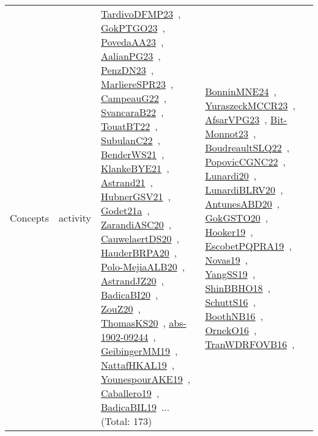 {\begin{longtable}{lp{3cm}>{\raggedright\arraybackslash}p{6cm}>{\raggedright\arraybackslash}p{6cm}>{\raggedright\arraybackslash}p{8cm}}
Concepts & activity & \href{../works/TardivoDFMP23.pdf}{TardivoDFMP23}~\cite{TardivoDFMP23}, \href{../works/GokPTGO23.pdf}{GokPTGO23}~\cite{GokPTGO23}, \href{../works/PovedaAA23.pdf}{PovedaAA23}~\cite{PovedaAA23}, \href{../works/AalianPG23.pdf}{AalianPG23}~\cite{AalianPG23}, \href{../works/PenzDN23.pdf}{PenzDN23}~\cite{PenzDN23}, \href{../works/MarliereSPR23.pdf}{MarliereSPR23}~\cite{MarliereSPR23}, \href{../works/CampeauG22.pdf}{CampeauG22}~\cite{CampeauG22}, \href{../works/SvancaraB22.pdf}{SvancaraB22}~\cite{SvancaraB22}, \href{../works/TouatBT22.pdf}{TouatBT22}~\cite{TouatBT22}, \href{../works/SubulanC22.pdf}{SubulanC22}~\cite{SubulanC22}, \href{../works/BenderWS21.pdf}{BenderWS21}~\cite{BenderWS21}, \href{../works/KlankeBYE21.pdf}{KlankeBYE21}~\cite{KlankeBYE21}, \href{../works/Astrand21.pdf}{Astrand21}~\cite{Astrand21}, \href{../works/HubnerGSV21.pdf}{HubnerGSV21}~\cite{HubnerGSV21}, \href{../works/Godet21a.pdf}{Godet21a}~\cite{Godet21a}, \href{../works/ZarandiASC20.pdf}{ZarandiASC20}~\cite{ZarandiASC20}, \href{../works/CauwelaertDS20.pdf}{CauwelaertDS20}~\cite{CauwelaertDS20}, \href{../works/HauderBRPA20.pdf}{HauderBRPA20}~\cite{HauderBRPA20}, \href{../works/Polo-MejiaALB20.pdf}{Polo-MejiaALB20}~\cite{Polo-MejiaALB20}, \href{../works/AstrandJZ20.pdf}{AstrandJZ20}~\cite{AstrandJZ20}, \href{../works/BadicaBI20.pdf}{BadicaBI20}~\cite{BadicaBI20}, \href{../works/ZouZ20.pdf}{ZouZ20}~\cite{ZouZ20}, \href{../works/ThomasKS20.pdf}{ThomasKS20}~\cite{ThomasKS20}, \href{../works/abs-1902-09244.pdf}{abs-1902-09244}~\cite{abs-1902-09244}, \href{../works/GeibingerMM19.pdf}{GeibingerMM19}~\cite{GeibingerMM19}, \href{../works/NattafHKAL19.pdf}{NattafHKAL19}~\cite{NattafHKAL19}, \href{../works/YounespourAKE19.pdf}{YounespourAKE19}~\cite{YounespourAKE19}, \href{../works/Caballero19.pdf}{Caballero19}~\cite{Caballero19}, \href{../works/BadicaBIL19.pdf}{BadicaBIL19}~\cite{BadicaBIL19}... (Total: 173) & \href{../works/BonninMNE24.pdf}{BonninMNE24}~\cite{BonninMNE24}, \href{../works/YuraszeckMCCR23.pdf}{YuraszeckMCCR23}~\cite{YuraszeckMCCR23}, \href{../works/AfsarVPG23.pdf}{AfsarVPG23}~\cite{AfsarVPG23}, \href{../works/Bit-Monnot23.pdf}{Bit-Monnot23}~\cite{Bit-Monnot23}, \href{../works/BoudreaultSLQ22.pdf}{BoudreaultSLQ22}~\cite{BoudreaultSLQ22}, \href{../works/PopovicCGNC22.pdf}{PopovicCGNC22}~\cite{PopovicCGNC22}, \href{../works/Lunardi20.pdf}{Lunardi20}~\cite{Lunardi20}, \href{../works/LunardiBLRV20.pdf}{LunardiBLRV20}~\cite{LunardiBLRV20}, \href{../works/AntunesABD20.pdf}{AntunesABD20}~\cite{AntunesABD20}, \href{../works/GokGSTO20.pdf}{GokGSTO20}~\cite{GokGSTO20}, \href{../works/Hooker19.pdf}{Hooker19}~\cite{Hooker19}, \href{../works/EscobetPQPRA19.pdf}{EscobetPQPRA19}~\cite{EscobetPQPRA19}, \href{../works/Novas19.pdf}{Novas19}~\cite{Novas19}, \href{../works/YangSS19.pdf}{YangSS19}~\cite{YangSS19}, \href{../works/ShinBBHO18.pdf}{ShinBBHO18}~\cite{ShinBBHO18}, \href{../works/SchuttS16.pdf}{SchuttS16}~\cite{SchuttS16}, \href{../works/BoothNB16.pdf}{BoothNB16}~\cite{BoothNB16}, \href{../works/OrnekO16.pdf}{OrnekO16}~\cite{OrnekO16}, \href{../works/TranWDRFOVB16.pdf}{TranWDRFOVB16}~\cite{TranWDRFOVB16}, 
\end{longtable}}
